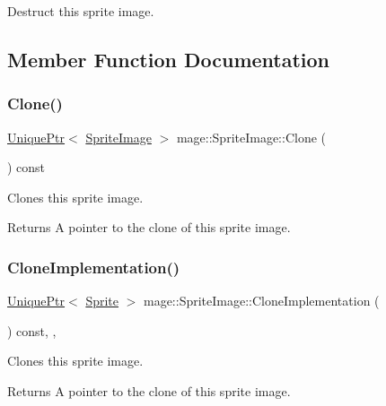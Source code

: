 Destruct this sprite image. 

\subsection{Member Function Documentation}
\hypertarget{classmage_1_1_sprite_image_a19db9a2a418dd04db0b38d1f8aa7e035}{}\label{classmage_1_1_sprite_image_a19db9a2a418dd04db0b38d1f8aa7e035} 
\subsubsection{\texorpdfstring{Clone()}{Clone()}}
{\footnotesize\ttfamily \hyperlink{namespacemage_a3316d7143a973e37adf1110f2e80ca31}{Unique\+Ptr}$<$ \hyperlink{classmage_1_1_sprite_image}{Sprite\+Image} $>$ mage\+::\+Sprite\+Image\+::\+Clone (\begin{DoxyParamCaption}{ }\end{DoxyParamCaption}) const}

Clones this sprite image.

\begin{DoxyReturn}{Returns}
A pointer to the clone of this sprite image. 
\end{DoxyReturn}
\hypertarget{classmage_1_1_sprite_image_ad6460971fc4ffb425b7a43d27c9b05b2}{}\label{classmage_1_1_sprite_image_ad6460971fc4ffb425b7a43d27c9b05b2} 
\subsubsection{\texorpdfstring{Clone\+Implementation()}{CloneImplementation()}}
{\footnotesize\ttfamily \hyperlink{namespacemage_a3316d7143a973e37adf1110f2e80ca31}{Unique\+Ptr}$<$ \hyperlink{classmage_1_1_sprite}{Sprite} $>$ mage\+::\+Sprite\+Image\+::\+Clone\+Implementation (\begin{DoxyParamCaption}{ }\end{DoxyParamCaption}) const\hspace{0.3cm}{\ttfamily [override]}, {\ttfamily [private]}, {\ttfamily [virtual]}}

Clones this sprite image.

\begin{DoxyReturn}{Returns}
A pointer to the clone of this sprite image. 
\end{DoxyReturn}


